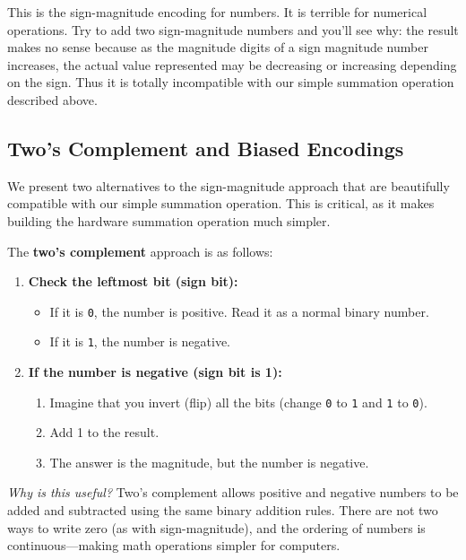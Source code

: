 \documentclass[12pt]{article}
\begin{document}
This is the sign-magnitude encoding for numbers. It is terrible for numerical operations. Try to add two sign-magnitude numbers and you'll see why: the result makes no sense because as the magnitude digits of a sign magnitude number increases, the actual value represented may be decreasing or increasing depending on the sign. Thus it is totally incompatible with our simple summation operation described above.

\subsection*{Two's Complement and Biased Encodings}

We present two alternatives to the sign-magnitude approach that are beautifully compatible with our simple summation operation. This is critical, as it makes building the hardware summation operation much simpler.

The \textbf{two's complement} approach is as follows:


\begin{enumerate}
    \item \textbf{Check the leftmost bit (sign bit):}
    \begin{itemize}
        \item If it is \texttt{0}, the number is positive. Read it as a normal binary number.
        \item If it is \texttt{1}, the number is negative.
    \end{itemize}
    \item \textbf{If the number is negative (sign bit is 1):}
    \begin{enumerate}
        \item Imagine that you invert (flip) all the bits (change \texttt{0} to \texttt{1} and \texttt{1} to \texttt{0}).
        \item Add 1 to the result.
        \item The answer is the magnitude, but the number is negative.
    \end{enumerate}
\end{enumerate}

\noindent
\textit{Why is this useful?} Two's complement allows positive and negative numbers to be added and subtracted using the same binary addition rules. There are not two ways to write zero (as with sign-magnitude), and the ordering of numbers is continuous—making math operations simpler for computers.

\begin{center}
\end{center}
\end{document}
